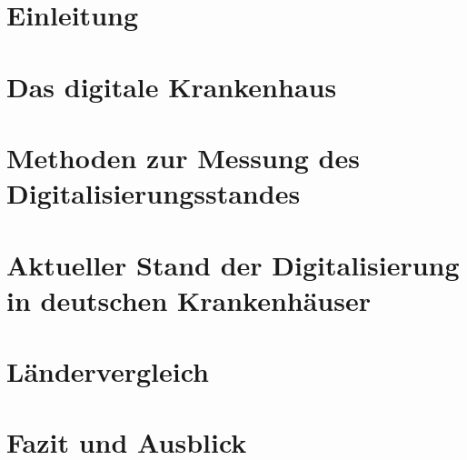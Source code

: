 
{}
\section{Einleitung}

\section{Das digitale Krankenhaus}

\section{Methoden zur Messung des Digitalisierungsstandes}

\section{Aktueller Stand der Digitalisierung in deutschen Krankenhäuser} \label{sec:stand in deutschland}

\section{Ländervergleich} \label{sec:laendervergleich}

\section{Fazit und Ausblick}

\newpage
{}
\setcounter{page}{3}
\printbibliography
{}

